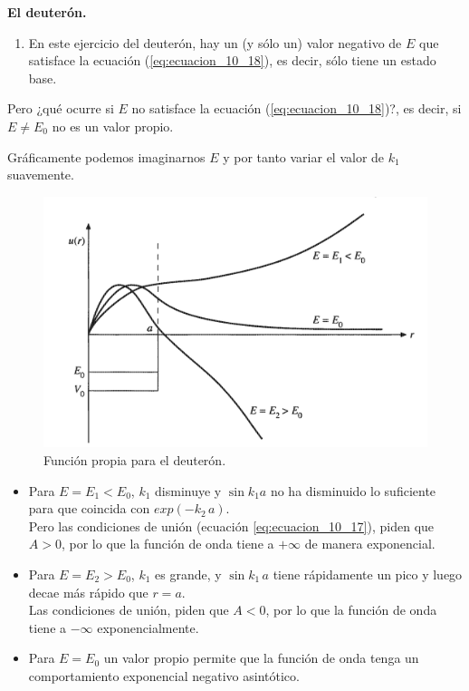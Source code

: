 \begin{ejemplo}{\textbf{El deuterón.}}
\begin{enumerate}
\item En este ejercicio del deuterón, hay un (y sólo un) valor negativo de $E$ que satisface la ecuación (\ref{eq:ecuacion_10_18}), es decir, sólo tiene un estado base.
\end{enumerate}
Pero ¿qué ocurre si $E$ no satisface la ecuación (\ref{eq:ecuacion_10_18})?, es decir, si $E \neq E_{0}$ no es un valor propio.
\par
Gráficamente podemos imaginarnos $E$ y por tanto variar el valor de $k_{1}$ suavemente.
\begin{figure}[!h]
    \centering
    \includegraphics[scale=1.3]{Imagenes/Tema3_01.png}
\caption{Función propia para el deuterón.}
\end{figure}
\begin{itemize}
\item Para $E = E_{1} < E_{0}$, $k_{1}$ disminuye y $\sin k_{1} a$ no ha disminuido lo suficiente para que coincida con $exp(-k_{2} \, a)$. 
\\
Pero las condiciones de unión (ecuación \ref{eq:ecuacion_10_17}), piden que $A > 0$, por lo que la función de onda tiene a $+\infty$ de manera exponencial.
\item Para $E = E_{2} > E_{0}$, $k_{1}$ es grande, y $\sin k_{1} \, a$ tiene rápidamente un pico y luego decae más rápido que $r = a$.
\\
Las condiciones de unión, piden que $A < 0$, por lo que la función de onda tiene a $-\infty$ exponencialmente.
\item Para $E = E_{0}$ un valor propio permite que la función de onda tenga un comportamiento exponencial negativo asintótico.
\end{itemize}
\end{ejemplo}
